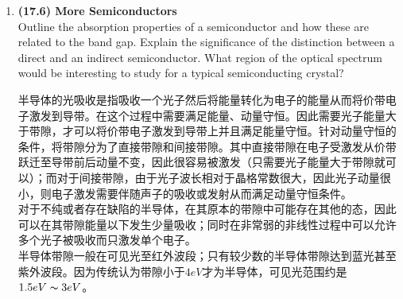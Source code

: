 \documentclass[reqno,a4paper,12pt]{amsart}
\begin{document}
\begin{enumerate}[1.]
\item \textbf{(17.6) More Semiconductors} \\
Outline the absorption properties of a semiconductor and how these are related to the band gap. Explain the significance of the distinction between a direct and an indirect semiconductor. What region of the optical spectrum would be interesting to study for a typical semiconducting crystal?
\begin{tcolorbox}[breakable, colback = black!5!white, colframe = black]
半导体的光吸收是指吸收一个光子然后将能量转化为电子的能量从而将价带电子激发到导带。在这个过程中需要满足能量、动量守恒。因此需要光子能量大于带隙，才可以将价带电子激发到导带上并且满足能量守恒。针对动量守恒的条件，将带隙分为了直接带隙和间接带隙。其中直接带隙在电子受激发从价带跃迁至导带前后动量不变，因此很容易被激发（只需要光子能量大于带隙就可以）；而对于间接带隙，由于光子波长相对于晶格常数很大，因此光子动量很小，则电子激发需要伴随声子的吸收或发射从而满足动量守恒条件。\\
对于不纯或者存在缺陷的半导体，在其原本的带隙中可能存在其他的态，因此可以在其带隙能量以下发生少量吸收；同时在非常弱的非线性过程中可以允许多个光子被吸收而只激发单个电子。 \\
半导体带隙一般在可见光至红外波段；只有较少数的半导体带隙达到蓝光甚至紫外波段。因为传统认为带隙小于$4eV$才为半导体，可见光范围约是$1.5eV\thicksim 3eV$。
\end{tcolorbox}


\end{enumerate}
\end{document}
